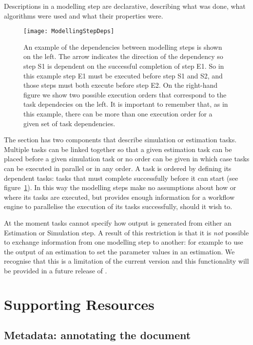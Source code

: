 Descriptions in a modelling step are declarative, describing what
was done, what algorithms were used and what their properties were.

\begin{figure}[htb]
 \centering
  \texttt{[image: ModellingStepDeps]}
  \caption{An example of the dependencies between modelling steps is
    shown on the left. The arrow indicates the direction of the
    dependency so step S1 is dependent on the successful completion of
    step E1. So in this example step E1 must be executed before step
    S1 and S2, and those steps must both execute before step E2. On
    the right-hand figure we show two possible execution orders that
    correspond to the task dependecies on the left. It is important to
    remember that, as in this example, there can be more than one
    execution order for a given set of task dependencies.}
  \label{fig:modellingstep_deps}
\end{figure}

The  section has two components that describe
simulation or estimation tasks. Multiple tasks can be linked together so
that a given estimation task can be placed before a given simulation
task or no order can be given in which case tasks can be executed in
parallel or in any order. A task is ordered by defining its dependent
tasks: tasks that must complete successfully before it can start (see
figure~\ref{fig:modellingstep_deps}). In this way the modelling steps
make no assumptions about how or where its tasks are executed, but
provides enough information for a workflow engine to parallelise the
execution of its tasks successfully, should it wish to.

At the moment tasks cannot specify how output is generated from either
an Estimation or Simulation step. A result of this restriction is that
it is \emph{not} possible to exchange information from one modelling
step to another: for example to use the output of an estimation to set
the parameter values in an estimation. We recognise that this is a
limitation of the current version and this functionality will be
provided in a future release of \pharmml.


\section{Supporting Resources}
\label{sec:supporting-res}

\subsection{Metadata: annotating the \pharmml document}
\label{sec:annotation}

